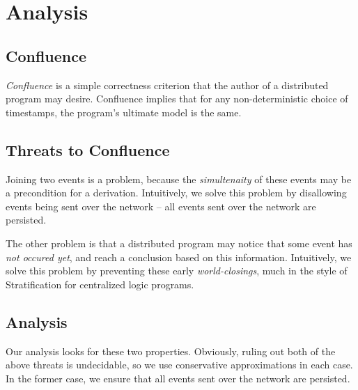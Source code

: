 \section{Analysis}
\label{sec:analysis}


\subsection{Confluence}

{\em Confluence} is a simple correctness criterion that the author of a
distributed program may desire.  Confluence implies that for any
non-deterministic choice of timestamps, the program's ultimate model is the
same.


\subsection{Threats to Confluence}

Joining two events is a problem, because the {\em simultenaity} of these events
may be a precondition for a derivation.  Intuitively, we solve this problem by
disallowing events being sent over the network -- all events sent over the
network are persisted. 

The other problem is that a distributed program may notice that some event has
{\em not occured yet}, and reach a conclusion based on this information.
Intuitively, we solve this problem by preventing these early {\em world-closings},
much in the style of Stratification for centralized logic programs.

\subsection{Analysis}

Our analysis looks for these two properties.  Obviously, ruling out both of the
above threats is undecidable, so we use conservative approximations in each
case.  In the former case, we ensure that all events sent over the network are
persisted.

